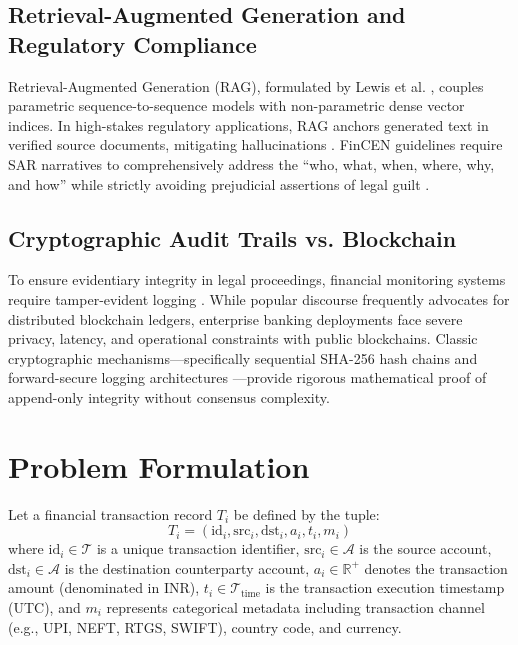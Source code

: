 \documentclass[10pt,journal,compsoc]{IEEEtran}
\begin{document}
\subsection{Retrieval-Augmented Generation and Regulatory Compliance}
Retrieval-Augmented Generation (RAG), formulated by Lewis et al. \cite{lewis2020retrieval}, couples parametric sequence-to-sequence models with non-parametric dense vector indices. In high-stakes regulatory applications, RAG anchors generated text in verified source documents, mitigating hallucinations \cite{reimers2019sentence}. FinCEN guidelines require SAR narratives to comprehensively address the ``who, what, when, where, why, and how'' while strictly avoiding prejudicial assertions of legal guilt \cite{fincen2020sar}.

\subsection{Cryptographic Audit Trails vs. Blockchain}
To ensure evidentiary integrity in legal proceedings, financial monitoring systems require tamper-evident logging \cite{crosby2009efficient}. While popular discourse frequently advocates for distributed blockchain ledgers, enterprise banking deployments face severe privacy, latency, and operational constraints with public blockchains. Classic cryptographic mechanisms---specifically sequential SHA-256 hash chains \cite{haber1991time} and forward-secure logging architectures \cite{bellare2003forward}---provide rigorous mathematical proof of append-only integrity without consensus complexity.

\section{Problem Formulation}
Let a financial transaction record $T_i$ be defined by the tuple:
\begin{equation}
T_i = \left(\text{id}_i, \text{src}_i, \text{dst}_i, a_i, t_i, m_i\right)
\end{equation}
where $\text{id}_i \in \mathcal{T}$ is a unique transaction identifier, $\text{src}_i \in \mathcal{A}$ is the source account, $\text{dst}_i \in \mathcal{A}$ is the destination counterparty account, $a_i \in \mathbb{R}^+$ denotes the transaction amount (denominated in INR), $t_i \in \mathcal{T}_{\text{time}}$ is the transaction execution timestamp (UTC), and $m_i$ represents categorical metadata including transaction channel (e.g., UPI, NEFT, RTGS, SWIFT), country code, and currency.
\end{document}
